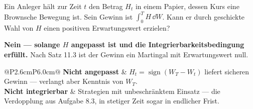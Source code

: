 \begin{aufgabe}
Ein Anleger hält zur Zeit $t$ den Betrag $H_t$ in einem Papier, dessen Kurs eine Brownsche Bewegung ist. Sein Gewinn ist $\int_0^T H\,\dd W$. Kann er durch geschickte Wahl von $H$ einen positiven Erwartungswert erzielen?

\loesung
{}
\begin{center}
\begin{minipage}{0.9\textwidth}
\textbf{Nein --- solange $H$ angepasst ist und die Integrierbarkeitsbedingung erfüllt.} Nach Satz 11.3 ist der Gewinn ein Martingal mit Erwartungswert null.
\end{minipage}
\end{center}

\begin{center}
{\small
\renewcommand{\arraystretch}{1.5}
\begin{tabular}{@{}P{2.6cm}P{6.0cm}@{}}
\toprule
\textbf{Nicht angepasst} & $H_t = \operatorname{sign}(W_T - W_t)$ liefert sicheren Gewinn --- verlangt aber Kenntnis von $W_T$.\\
\textbf{Nicht integrierbar} & Strategien mit unbeschränktem Einsatz --- die Verdopplung aus Aufgabe 8.3, in stetiger Zeit sogar in endlicher Frist.\\
\bottomrule
\end{tabular}}
\end{center}

\begin{center}
\begin{minipage}{0.88\textwidth}
\end{minipage}
\end{center}
\end{aufgabe}

